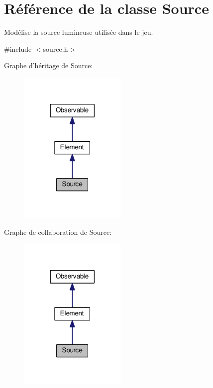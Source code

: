 \hypertarget{classSource}{\section{Référence de la classe Source}
\label{classSource}
}


Modélise la source lumineuse utilisée dans le jeu.  




{\ttfamily \#include $<$source.\+h$>$}



Graphe d'héritage de Source\+:\nopagebreak
\begin{figure}[H]
\begin{center}
\leavevmode
\includegraphics[width=146pt]{da/d95/classSource__inherit__graph}
\end{center}
\end{figure}


Graphe de collaboration de Source\+:\nopagebreak
\begin{figure}[H]
\begin{center}
\leavevmode
\includegraphics[width=146pt]{d1/d35/classSource__coll__graph}
\end{center}
\end{figure}
